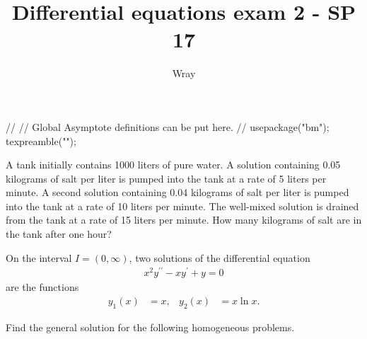 \documentclass[12pt]{exam}
\title{Differential equations exam 2 - SP 17}
\author{Wray}
\begin{document}
\begin{asydef}
//
// Global Asymptote definitions can be put here.
//
usepackage("bm");
texpreamble("\def\V#1{\bm{#1}}");
\end{asydef}

\bigskip
\bigskip

\begin{questions}

\question[20]
A tank initially contains 1000 liters of pure water.  A solution containing 0.05 kilograms of salt per liter is pumped into the tank at a rate of 5 liters per minute.  A second solution containing 0.04 kilograms of salt per liter is pumped into the tank at a rate of 10 liters per minute.  The well-mixed solution is drained from the tank at a rate of 15 liters per minute.  How many kilograms of salt are in the tank after one hour?

\clearpage


\question[5]
On the interval $I = (0,\infty)$, two solutions of the differential equation 
\begin{align*}
	x^2 y^{\prime \prime} -xy^{\prime} + y = 0
\end{align*}
are the functions
\begin{align*}
	y_1(x) & = x, & y_2(x) & = x \ln x.
\end{align*}



\question[20]
Find the general solution for the following homogeneous problems.

\end{questions}
\end{document}
